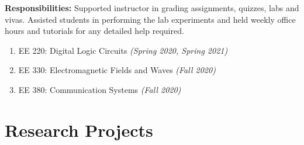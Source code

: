 \documentclass[11pt,a4paper,sans]{moderncv}        %
\begin{document}
\textbf{Responsibilities:} Supported instructor in grading assignments, quizzes, labs and vivas. Assisted students in performing the lab experiments and held weekly office hours and tutorials for any detailed help required.
\begin{enumerate}
    \item EE 220: Digital Logic Circuits \textit{(Spring 2020, Spring 2021)}
    \item EE 330: Electromagnetic Fields and Waves \textit{(Fall 2020)}
    \item EE 380: Communication Systems \textit{(Fall 2020)}
\end{enumerate}


\section{Research Projects}

\vspace{4pt}
\end{document}
